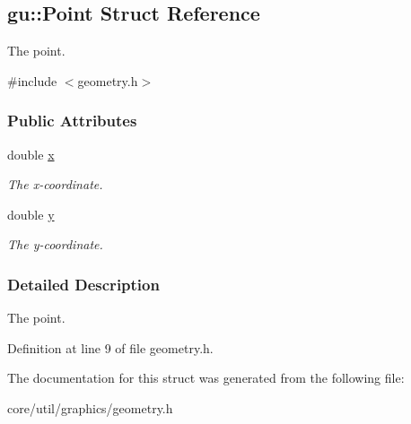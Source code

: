 \hypertarget{structgu_1_1Point}{}\subsection{gu\+:\+:Point Struct Reference}
\label{structgu_1_1Point}


The point.  




{\ttfamily \#include $<$geometry.\+h$>$}

\subsubsection*{Public Attributes}
\begin{DoxyCompactItemize}
\item 
double \hyperlink{structgu_1_1Point_a6df7e3778cd24f77a269b71fc3697309}{x}\hypertarget{structgu_1_1Point_a6df7e3778cd24f77a269b71fc3697309}{}\label{structgu_1_1Point_a6df7e3778cd24f77a269b71fc3697309}

\begin{DoxyCompactList}\small\item\em The x-\/coordinate. \end{DoxyCompactList}\item 
double \hyperlink{structgu_1_1Point_af6b212e690b6cecab07168c673a6af7f}{y}\hypertarget{structgu_1_1Point_af6b212e690b6cecab07168c673a6af7f}{}\label{structgu_1_1Point_af6b212e690b6cecab07168c673a6af7f}

\begin{DoxyCompactList}\small\item\em The y-\/coordinate. \end{DoxyCompactList}\end{DoxyCompactItemize}


\subsubsection{Detailed Description}
The point. 

Definition at line 9 of file geometry.\+h.



The documentation for this struct was generated from the following file\+:\begin{DoxyCompactItemize}
\item 
core/util/graphics/geometry.\+h\end{DoxyCompactItemize}
